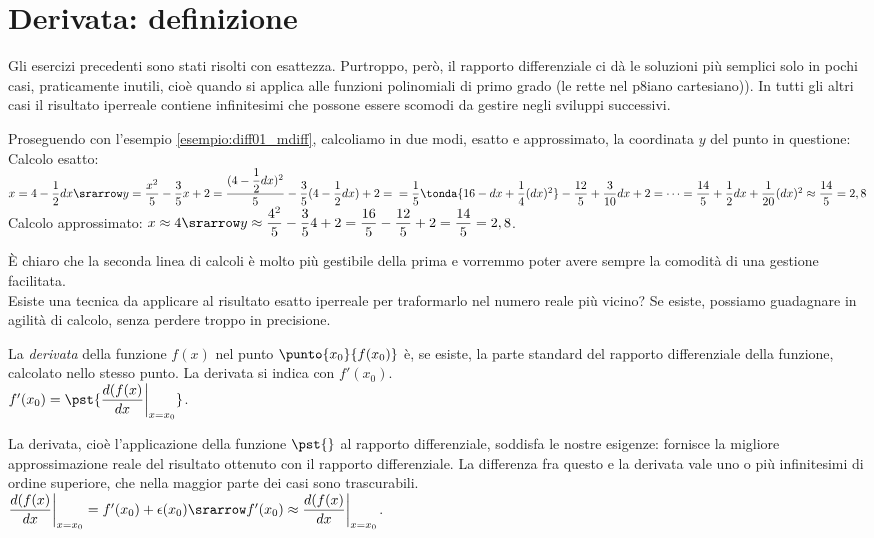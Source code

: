 \section{Derivata: definizione}
\label{sec:diff01_deriv}
Gli esercizi precedenti sono stati risolti con esattezza.
Purtroppo, però, il rapporto differenziale ci dà le soluzioni più semplici solo 
in pochi casi, praticamente inutili, cioè quando si applica alle funzioni 
polinomiali di primo grado (le rette nel p8iano cartesiano)).
In tutti gli altri casi il risultato
iperreale contiene infinitesimi che possone essere scomodi da gestire
negli sviluppi successivi.

\begin{esempio}
 Proseguendo con l'esempio \ref{esempio:diff01_mdiff}, calcoliamo in due 
 modi, esatto e approssimato, la coordinata $y$ del punto in questione:\\
 Calcolo esatto: $x=4-\dfrac{1}{2}dx\srarrow y=\dfrac{x^2}{5}-\dfrac{3}{5}x+2=
 \dfrac{(4-\dfrac{1}{2}dx)^2}{5}-\dfrac{3}{5}(4-\dfrac{1}{2}dx)+2=\\
 =\dfrac{1}{5}\tonda{16-dx+\dfrac{1}{4}(dx)^2}-\dfrac{12}{5}+\dfrac{3}{10}dx+2=
 \cdots= \dfrac{14}{5}+\dfrac{1}{2}dx+\dfrac{1}{20}(dx)^2\approx \dfrac{14}{5}
 =2,8$\\
 Calcolo approssimato: $x\approx 4\srarrow 
 y\approx\dfrac{4^2}{5}-\dfrac{3}{5}4+2=
 \dfrac{16}{5}-\dfrac{12}{5}+2=\dfrac{14}{5}=2,8$.\\
\end{esempio}

È chiaro che la seconda linea di calcoli è molto più gestibile della prima e
vorremmo poter avere sempre la comodità di una gestione facilitata.\\
Esiste una tecnica da applicare al risultato esatto iperreale per traformarlo 
nel numero reale più vicino? Se esiste, possiamo guadagnare in agilità di 
calcolo, senza perdere troppo in precisione.

\begin{definizione}
  La \emph{derivata} della funzione $f(x)$ nel punto $\punto{x_0}{f(x_0)}$
  è, se esiste, la parte standard del rapporto differenziale della funzione,
  calcolato nello stesso punto. La derivata si indica con $f'(x_0)$.\\
  $f'(x_0)=\pst{\dfrac{d(f(x)}{dx}\bigg|_{x=x_0}}$.
\end{definizione}

La derivata, cioè l'applicazione della funzione $\pst{}$ al rapporto
differenziale, soddisfa le nostre 
esigenze: fornisce la migliore approssimazione reale del risultato ottenuto 
con il rapporto differenziale. La differenza fra questo e la 
derivata vale uno o più infinitesimi di ordine superiore, che nella 
maggior parte dei casi sono trascurabili.\\
$\dfrac{d(f(x)}{dx}\bigg|_{x=x_0}=f'(x_0)+\epsilon(x_0)\srarrow f'(x_0)
\approx \dfrac{d(f(x)}{dx}\bigg|_{x=x_0}$.

